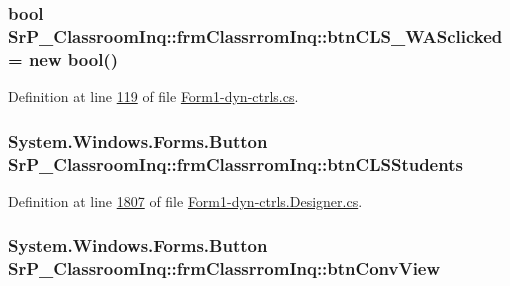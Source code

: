 \hypertarget{class_sr_p___classroom_inq_1_1frm_classrrom_inq_aed9d1ad7c4e2b196997c1820ac2cdb4d}{
\subsubsection[{btn\-C\-L\-S\-\_\-\-W\-A\-Sclicked}]{\setlength{\rightskip}{0pt plus 5cm}bool {\bf \-Sr\-P\-\_\-\-Classroom\-Inq\-::frm\-Classrrom\-Inq\-::btn\-C\-L\-S\-\_\-\-W\-A\-Sclicked} = new bool()}}
\label{class_sr_p___classroom_inq_1_1frm_classrrom_inq_aed9d1ad7c4e2b196997c1820ac2cdb4d}


\-Definition at line \hyperlink{_form1-dyn-ctrls_8cs_source_l00119}{119} of file \hyperlink{_form1-dyn-ctrls_8cs_source}{\-Form1-\/dyn-\/ctrls.\-cs}.

\hypertarget{class_sr_p___classroom_inq_1_1frm_classrrom_inq_a0aed8d1ecf711f52b3a948fdeae6ac5b}{
\subsubsection[{btn\-C\-L\-S\-Students}]{\setlength{\rightskip}{0pt plus 5cm}\-System.\-Windows.\-Forms.\-Button {\bf \-Sr\-P\-\_\-\-Classroom\-Inq\-::frm\-Classrrom\-Inq\-::btn\-C\-L\-S\-Students}}}
\label{class_sr_p___classroom_inq_1_1frm_classrrom_inq_a0aed8d1ecf711f52b3a948fdeae6ac5b}


\-Definition at line \hyperlink{_form1-dyn-ctrls_8_designer_8cs_source_l01807}{1807} of file \hyperlink{_form1-dyn-ctrls_8_designer_8cs_source}{\-Form1-\/dyn-\/ctrls.\-Designer.\-cs}.

\hypertarget{class_sr_p___classroom_inq_1_1frm_classrrom_inq_ab75b7c14e1f4b71b6513122c99dbe532}{
\subsubsection[{btn\-Conv\-View}]{\setlength{\rightskip}{0pt plus 5cm}\-System.\-Windows.\-Forms.\-Button {\bf \-Sr\-P\-\_\-\-Classroom\-Inq\-::frm\-Classrrom\-Inq\-::btn\-Conv\-View}}}
\label{class_sr_p___classroom_inq_1_1frm_classrrom_inq_ab75b7c14e1f4b71b6513122c99dbe532}


